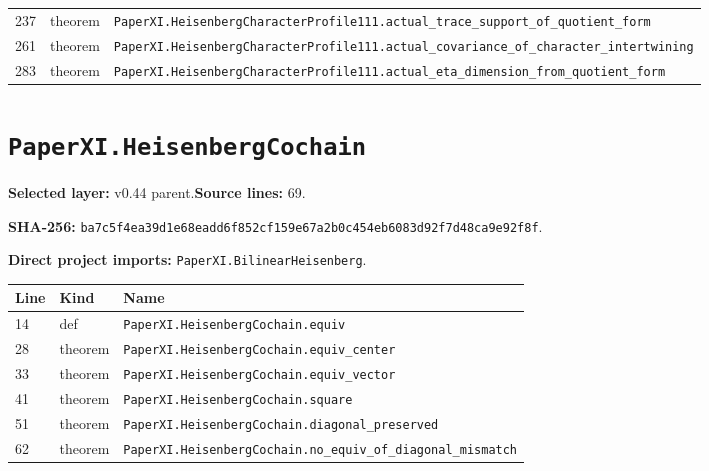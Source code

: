 \documentclass[10pt,oneside]{book}
\begin{document}
\begin{longtable}{@{}p{}p{}p{}@{}}
237&theorem&\nolinkurl{PaperXI.HeisenbergCharacterProfile111.actual_trace_support_of_quotient_form}\\

261&theorem&\nolinkurl{PaperXI.HeisenbergCharacterProfile111.actual_covariance_of_character_intertwining}\\

283&theorem&\nolinkurl{PaperXI.HeisenbergCharacterProfile111.actual_eta_dimension_from_quotient_form}\\

\bottomrule\end{longtable}

\section{\texorpdfstring{\nolinkurl{PaperXI.HeisenbergCochain}}{PaperXI.HeisenbergCochain}}\label{module:PaperXI.HeisenbergCochain}

\textbf{Selected layer:} v0.44 parent.\quad\textbf{Source lines:} 69.\par\textbf{SHA-256:} {\scriptsize\nolinkurl{ba7c5f4ea39d1e68eadd6f852cf159e67a2b0c454eb6083d92f7d48ca9e92f8f}}.


\textbf{Direct project imports:} \nolinkurl{PaperXI.BilinearHeisenberg}.

\begin{longtable}{@{}p{}p{}p{}@{}}\toprule Line&Kind&Name\\\midrule\endhead

14&def&\nolinkurl{PaperXI.HeisenbergCochain.equiv}\\

28&theorem&\nolinkurl{PaperXI.HeisenbergCochain.equiv_center}\\

33&theorem&\nolinkurl{PaperXI.HeisenbergCochain.equiv_vector}\\

41&theorem&\nolinkurl{PaperXI.HeisenbergCochain.square}\\

51&theorem&\nolinkurl{PaperXI.HeisenbergCochain.diagonal_preserved}\\

62&theorem&\nolinkurl{PaperXI.HeisenbergCochain.no_equiv_of_diagonal_mismatch}\\

\bottomrule\end{longtable}
\end{document}
